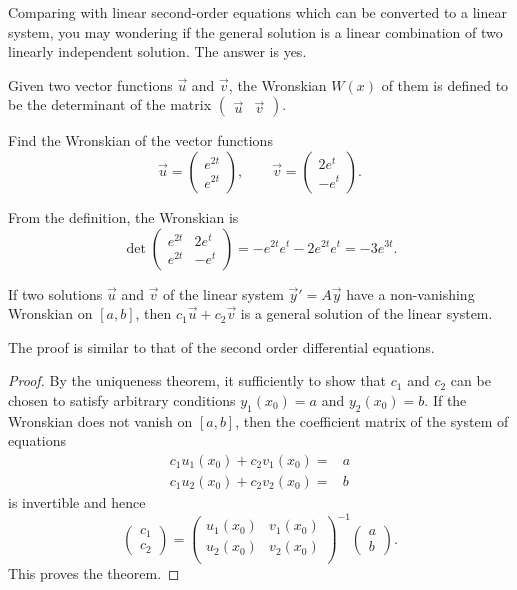Comparing with linear second-order equations which can be converted to a linear system, you may wondering if the general solution is a linear combination of two linearly independent solution. The answer is yes.

Given two vector functions $\vec{u}$ and $\vec{v}$, the Wronskian $W(x)$ of them is defined to be the determinant of the matrix $\begin{pmatrix}
  \vec{u} & \vec{v}
\end{pmatrix}$.

\begin{example}
  Find the Wronskian of the vector functions
  \[
  \vec{u}=\begin{pmatrix}
    e^{2t} \\  e^{2t}
  \end{pmatrix},  \qquad
  \vec{v}=\begin{pmatrix}
    2e^t \\ -e^t
  \end{pmatrix}.
  \]
\end{example}
\begin{solution}
  From the definition, the Wronskian is
  \[
  \det\begin{pmatrix}
    e^{2t} & 2e^t\\
    e^{2t} & -e^t
  \end{pmatrix}=-e^{2t}e^{t}-2e^{2t}e^t=-3e^{3t}.  
  \]
\end{solution}

\begin{theorem}
  If two solutions $\vec{u}$ and $\vec{v}$ of the linear system $\vec{y}'=A\vec{y}$ have a non-vanishing Wronskian on $[a, b]$, then $c_1\vec{u}+c_2\vec{v}$ is a general solution of the linear system.
\end{theorem}
The proof is similar to that of the second order differential equations.
\begin{proof}
  By the uniqueness theorem, it sufficiently to show that $c_1$ and $c_2$ can be chosen to satisfy arbitrary conditions $y_1(x_0)=a$ and $y_2(x_0)=b$.
  If the Wronskian does not vanish on $[a, b]$, then the coefficient matrix of the system of equations
\[
  \begin{aligned}
    c_1 u_1(x_0) + c_2 v_1(x_0)= &a\\ 
    c_1 u_2(x_0) + c_2 v_2(x_0)= &b 
  \end{aligned}
\]
is invertible and hence 
\[
\begin{pmatrix}
  c_1 \\ c_2
\end{pmatrix}=\begin{pmatrix}
  u_1(x_0) & v_1(x_0)\\
  u_2(x_0) & v_2(x_0)\\
\end{pmatrix}^{-1}  \begin{pmatrix}
  a \\ b
\end{pmatrix}.
\]
This proves the theorem.
\end{proof}


